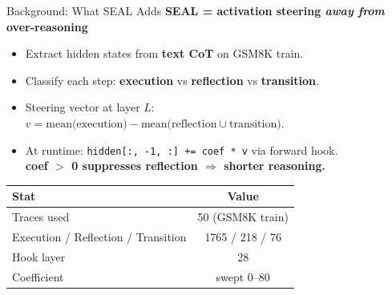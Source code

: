 \documentclass{beamer}
\begin{document}
\begin{frame}{Background: What SEAL Adds}
    \textbf{SEAL = activation steering \emph{away from} over-reasoning}
    \begin{itemize}
        \item Extract hidden states from \textbf{text CoT} on GSM8K train.
        \item Classify each step: \textbf{execution} vs \textbf{reflection} vs \textbf{transition}.
        \item Steering vector at layer $L$: \\ $v = \text{mean(execution)} - \text{mean(reflection} \cup \text{transition)}$.
        \item At runtime: \texttt{hidden[:, -1, :] += coef * v} via forward hook. \\ \textbf{coef $>$ 0 suppresses reflection $\Rightarrow$ shorter reasoning.}
    \end{itemize}
    \vspace{0.3cm}
    \begin{table}[]
        \centering
        \begin{tabular}{|l|c|}
            \hline
            \textbf{Stat} & \textbf{Value} \\ \hline
            Traces used & 50 (GSM8K train) \\ \hline
            Execution / Reflection / Transition & 1765 / 218 / 76 \\ \hline
            Hook layer & 28 \\ \hline
            Coefficient & swept 0--80 \\ \hline
        \end{tabular}
    \end{table}
\end{frame}
\end{document}

